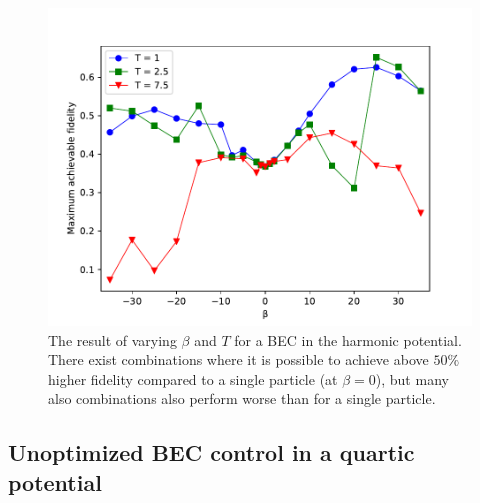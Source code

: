 \documentclass[a4paper, twocolumn]{revtex4-1}
\begin{document}
\begin{figure}[h]
	\includegraphics[width=\columnwidth]{graphics/exploration/betaTHO.pdf}
	\caption{The result of varying $\beta$ and $T$ for a BEC in the harmonic potential. There exist combinations where it is possible to achieve above $50\%$ higher fidelity compared to a single particle (at $\beta=0$), but many also combinations also perform worse than for a single particle.}
	\label{fig:HO}
\end{figure}

\subsection{Unoptimized BEC control in a quartic potential}
\end{document}
